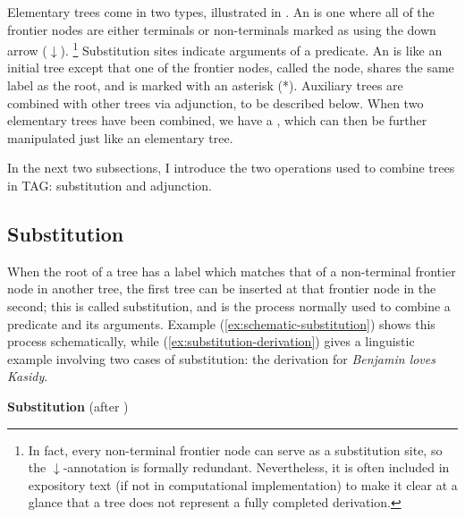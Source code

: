 \documentclass[output=paper,hidelinks]{langscibook}
\begin{document}
Elementary trees come in two types, illustrated in . An  is one where all of the
frontier nodes are either terminals or non-terminals marked as  using the down arrow ($\downarrow$).%
%
\footnote{In fact, every non-terminal frontier node can serve as a substitution site, so the $\downarrow$-annotation is formally redundant.
  Nevertheless, it is often included in expository text (if not in
  computational implementation) to make it clear at a glance that a tree does
  not represent a fully completed derivation.}
%
Substitution sites indicate
arguments of a predicate. An  is like an initial tree except
that one of the frontier nodes, called the  node, shares the same label
as the root, and is marked with an asterisk (*). Auxiliary trees are combined
with other trees via adjunction, to be described below. When two elementary
trees have been combined, we have a , which can then be further
manipulated just like an elementary tree.

In the next two subsections, I introduce the two operations used to combine
trees in TAG: substitution and adjunction.

\subsection{Substitution}

When the root of a tree has a label which matches that of a non-terminal
frontier node in another tree, the first tree can be inserted at that frontier
node in the second; this is called substitution, and is the process normally
used to combine a predicate and its arguments. Example
(\ref{ex:schematic-substitution}) shows this process schematically, while
(\ref{ex:substitution-derivation}) gives a linguistic example involving two
cases of substitution: the derivation for \textit{Benjamin loves Kasidy}.


\ea\label{ex:schematic-substitution} \textbf{Substitution} (after \citealp[5]{abeille-rambow2000})
\z
\end{document}
